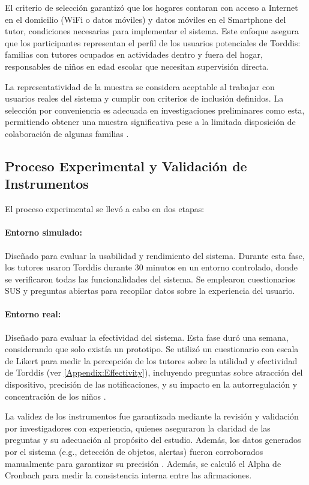 \documentclass[a4paper,fleqn]{cas-sc}
\begin{document}
			El criterio de selección garantizó que los hogares contaran con acceso a Internet en el domicilio (WiFi o datos móviles) y datos móviles en el Smartphone del tutor, condiciones necesarias para implementar el sistema. Este enfoque asegura que los participantes representan el perfil de los usuarios potenciales de Torddis: familias con tutores ocupados en actividades dentro y fuera del hogar, responsables de niños en edad escolar que necesitan supervisión directa.
				
			La representatividad de la muestra se considera aceptable al trabajar con usuarios reales del sistema y cumplir con criterios de inclusión definidos. La selección por conveniencia es adecuada en investigaciones preliminares como esta, permitiendo obtener una muestra significativa pese a la limitada disposición de colaboración de algunas familias \citep{DiPietro2025Meta}.
				
		\subsection{Proceso Experimental y Validación de Instrumentos}
			El proceso experimental se llevó a cabo en dos etapas:
				
			\paragraph{Entorno simulado:} Diseñado para evaluar la usabilidad y rendimiento del sistema. Durante esta fase, los tutores usaron Torddis durante 30 minutos en un entorno controlado, donde se verificaron todas las funcionalidades del sistema. Se emplearon cuestionarios SUS y preguntas abiertas para recopilar datos sobre la experiencia del usuario.
			
			\paragraph{Entorno real:} Diseñado para evaluar la efectividad del sistema. Esta fase duró una semana, considerando que solo existía un prototipo. Se utilizó un cuestionario con escala de Likert para medir la percepción de los tutores sobre la utilidad y efectividad de Torddis (ver \ref{Appendix:Effectivity}), incluyendo preguntas sobre atracción del dispositivo, precisión de las notificaciones, y su impacto en la autorregulación y concentración de los niños \citep{Ackermans2025Young}.
				
			La validez de los instrumentos fue garantizada mediante la revisión y validación por investigadores con experiencia, quienes aseguraron la claridad de las preguntas y su adecuación al propósito del estudio. Además, los datos generados por el sistema (e.g., detección de objetos, alertas) fueron corroborados manualmente para garantizar su precisión \citep{Wang2025Development}. Además, se calculó el Alpha de Cronbach \citep{Forero2024Cronbach} para medir la consistencia interna entre las afirmaciones.
			
\end{document}

